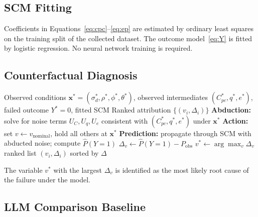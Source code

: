 \documentclass[journal]{IEEEtran}
\begin{document}
\subsection{SCM Fitting}

Coefficients in Equations~\eqref{eq:cpc}--\eqref{eq:ep} are
estimated by ordinary least squares on the training split of the
collected dataset.  The outcome model~\eqref{eq:Y} is fitted by
logistic regression.  No neural network training is required.

\subsection{Counterfactual Diagnosis}

\begin{algorithm}[t]
\caption{SCM Counterfactual Failure Diagnosis}
\label{alg:diagnosis}
\begin{algorithmic}[1]
\Require Observed conditions $\mathbf{x}^* = (\sigma_d^*, \rho^*,
         \phi^*, \theta^*)$, observed intermediates
         $(C_{pc}^*, q^*, e^*)$, failed outcome $Y^*{=}0$,
         fitted SCM
\Ensure  Ranked attribution $\{(v_i, \Delta_i)\}$
\State \textbf{Abduction:} solve for noise terms
       $U_C, U_q, U_e$ consistent with
       $(C_{pc}^*, q^*, e^*)$ under $\mathbf{x}^*$
  \State \textbf{Action:} set $v \leftarrow v_{\text{nominal}}$,
         hold all others at $\mathbf{x}^*$
  \State \textbf{Prediction:} propagate through SCM with
         abducted noise; compute $\hat{P}(Y{=}1)$
  \State $\Delta_v \leftarrow \hat{P}(Y{=}1) - P_{\text{obs}}$
\EndFor
\State $v^* \leftarrow \arg\max_v \Delta_v$
\State \Return ranked list $(v_i, \Delta_i)$ sorted by $\Delta$
\end{algorithmic}
\end{algorithm}

The variable $v^*$ with the largest $\Delta_v$ is identified as
the most likely root cause of the failure under the model.

\subsection{LLM Comparison Baseline}
\end{document}
